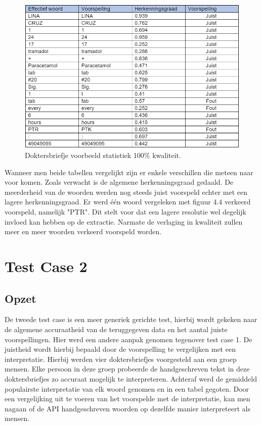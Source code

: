 \clearpage
\begin{figure}[h]
	
	\includegraphics[width=\textwidth,height=\textheight,keepaspectratio]{../Foto's/doktersbriefje0_60procent_tabel}
	\captionsetup{justification=centering,margin=2cm}
	\caption{Doktersbriefje voorbeeld statistiek 100\% kwaliteit. \cite{}}
	\centering
\end{figure}


Wanneer men beide tabellen vergelijkt zijn er enkele verschillen die meteen naar voor komen. Zoals verwacht is de algemene herkenningsgraad gedaald. De meerderheid van de woorden werden nog steeds juist voorspeld echter met een lagere herkenningsgraad. Er werd één woord vergeleken met figuur 4.4 verkeerd voorspeld, namelijk "PTR". Dit stelt voor dat een lagere resolutie wel degelijk invloed kan hebben op de extractie. Narmate de verlaging in kwaliteit zullen meer en meer woorden verkeerd voorspeld worden.



\section{Test Case 2}
\subsection{Opzet}
De tweede test case is een meer generiek gerichte test, hierbij wordt gekeken naar de algemene accuraatheid van de teruggegeven data en het aantal juiste voorspellingen. Hier werd een andere aanpak genomen tegenover test case 1. De juistheid wordt hierbij bepaald door de voorspelling te vergelijken met een interpretatie. Hierbij werden vier doktersbriefjes voorgesteld aan een groep mensen. Elke persoon in deze groep probeerde de handgeschreven tekst in deze doktersbriefjes zo accuraat mogelijk te interpreteren.  Achteraf werd de gemiddeld populairste interpretatie van elk woord genomen en in een tabel gegoten. Door een vergelijking uit te voeren van het voorspelde met de interpretatie, kan men nagaan of de API handgeschreven woorden op dezelfde manier interpreteert als mensen. 
